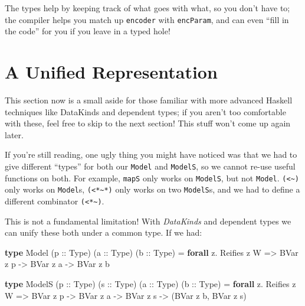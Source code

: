 \documentclass[]{article}
\newenvironment{Shaded}{}{}
\newcommand{\DataTypeTok}[1]{\textcolor[rgb]{0.56,0.13,0.00}{#1}}
\newcommand{\KeywordTok}[1]{\textcolor[rgb]{0.00,0.44,0.13}{\textbf{#1}}}
\newcommand{\NormalTok}[1]{#1}
\newcommand{\OperatorTok}[1]{\textcolor[rgb]{0.40,0.40,0.40}{#1}}
\newcommand{\OtherTok}[1]{\textcolor[rgb]{0.00,0.44,0.13}{#1}}
\begin{document}
The types help by keeping track of what goes with what, so you don't have to;
the compiler helps you match up \texttt{encoder} with \texttt{encParam}, and can
even ``fill in the code'' for you if you leave in a typed hole!

\section{A Unified Representation}\label{a-unified-representation}

This section now is a small aside for those familiar with more advanced Haskell
techniques like DataKinds and dependent types; if you aren't too comfortable
with these, feel free to skip to the next section! This stuff won't come up
again later.

If you're still reading, one ugly thing you might have noticed was that we had
to give different ``types'' for both our \texttt{Model} and \texttt{ModelS}, so
we cannot re-use useful functions on both. For example, \texttt{mapS} only works
on \texttt{ModelS}, but not \texttt{Model}.
\texttt{(\textless{}\textasciitilde{})} only works on \texttt{Model}s,
\texttt{(\textless{}*\textasciitilde{}*)} only works on two \texttt{ModelS}s,
and we had to define a different combinator
\texttt{(\textless{}*\textasciitilde{})}.

This is not a fundamental limitation! With \emph{DataKinds} and dependent types
we can unify these both under a common type. If we had:

\begin{Shaded}
\begin{Highlighting}[]
\KeywordTok{type} \DataTypeTok{Model}\NormalTok{ (}\OtherTok{p ::} \DataTypeTok{Type}\NormalTok{) (}\OtherTok{a ::} \DataTypeTok{Type}\NormalTok{) (}\OtherTok{b ::} \DataTypeTok{Type}\NormalTok{) }\OtherTok{=}
       \KeywordTok{forall}\NormalTok{ z}\OperatorTok{.} \DataTypeTok{Reifies}\NormalTok{ z }\DataTypeTok{W}
    \OtherTok{=\textgreater{}} \DataTypeTok{BVar}\NormalTok{ z p}
    \OtherTok{{-}\textgreater{}} \DataTypeTok{BVar}\NormalTok{ z a}
    \OtherTok{{-}\textgreater{}} \DataTypeTok{BVar}\NormalTok{ z b}

\KeywordTok{type} \DataTypeTok{ModelS}\NormalTok{ (}\OtherTok{p ::} \DataTypeTok{Type}\NormalTok{) (}\OtherTok{s ::} \DataTypeTok{Type}\NormalTok{) (}\OtherTok{a ::} \DataTypeTok{Type}\NormalTok{) (}\OtherTok{b ::} \DataTypeTok{Type}\NormalTok{) }\OtherTok{=}
       \KeywordTok{forall}\NormalTok{ z}\OperatorTok{.} \DataTypeTok{Reifies}\NormalTok{ z }\DataTypeTok{W}
    \OtherTok{=\textgreater{}} \DataTypeTok{BVar}\NormalTok{ z p}
    \OtherTok{{-}\textgreater{}} \DataTypeTok{BVar}\NormalTok{ z a}
    \OtherTok{{-}\textgreater{}} \DataTypeTok{BVar}\NormalTok{ z s}
    \OtherTok{{-}\textgreater{}}\NormalTok{ (}\DataTypeTok{BVar}\NormalTok{ z b, }\DataTypeTok{BVar}\NormalTok{ z s)}
\end{Highlighting}
\end{Shaded}
\end{document}
